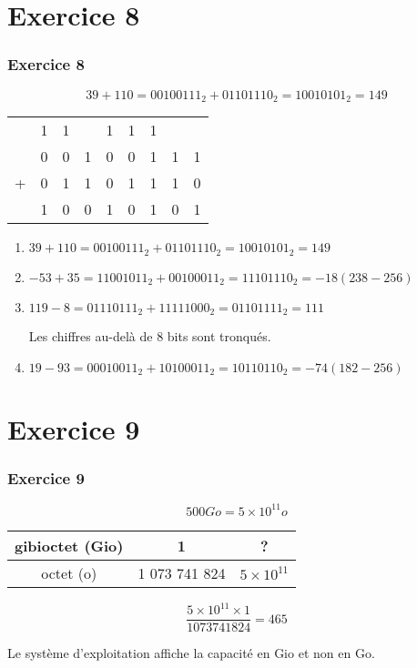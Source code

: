 \documentclass[svgnames,11pt]{beamer}
\begin{document}
\section{Exercice 8}
\begin{frame}
    \frametitle{Exercice 8}
    $$39+110=00100111_2+01101110_2=10010101_2=149$$
    \begin{center}
        \begin{tabular}{*{9}{c}}
              & {\small 1}&  {\small 1} &   & {\small 1} & {\small 1} &  {\small 1} &   &    \\
              & 0 & 0 & 1 & 0 & 0 & 1 & 1 & 1 \\
            + & 0 & 1 & 1 & 0 & 1 & 1 & 1 & 0 \\
            \hline
              & 1 & 0 & 0 & 1 & 0 & 1 & 0 & 1 \\
        \end{tabular}
    \end{center}

\end{frame}
\begin{frame}

    \begin{enumerate}
        \item $39+110=00100111_2+01101110_2=10010101_2=149$ 
        \item $-53+35=11001011_2+00100011_2=11101110_2=-18 (238-256)$
        \item $119-8=01110111_2+11111000_2=01101111_2=111$ 
        \begin{aretenir}[Remarque]
            Les chiffres au-delà de 8 bits sont tronqués.
        \end{aretenir}
        \item $19-93=00010011_2+10100011_2=10110110_2=-74 (182-256)$
    \end{enumerate}

\end{frame}
\section{Exercice 9}
\begin{frame}
    \frametitle{Exercice 9}

    $$500Go=5×10^{11}o$$
    \begin{center}
        \begin{tabular}{|*{3}{c|}}
            \hline
            gibioctet (Gio)&1&?\\
            \hline
            octet (o)&1 073 741 824&$5×10^{11}$\\
            \hline
        \end{tabular}
    \end{center}
$$\frac{5×10^{11}×1}{1 073 741 824}=465$$
\begin{center}
    Le système d'exploitation affiche la capacité en Gio et non en Go.
\end{center}
\end{frame}
\end{document}
